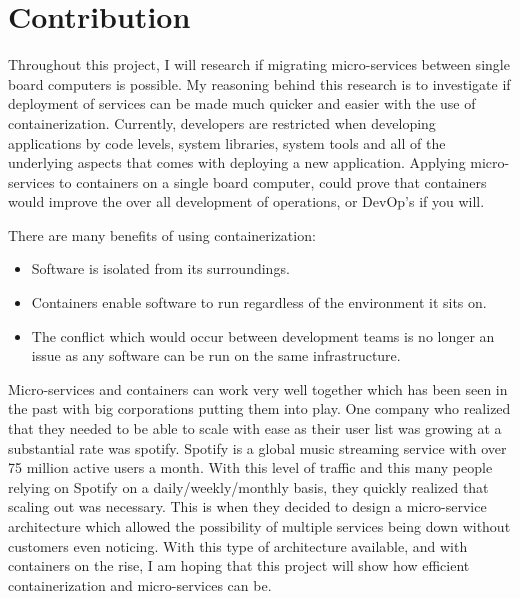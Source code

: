 
\section{Contribution}
Throughout this project, I will research if migrating micro-services between single board computers is possible. My reasoning behind this research is to investigate if deployment of services can be made much quicker and easier with the use of containerization. Currently, developers are restricted when developing applications by code levels, system libraries, system tools and all of the underlying aspects that comes with deploying a new application. Applying micro-services to containers on a single board computer, could prove that containers would improve the over all development of operations, or DevOp's if you will. 

There are many benefits of using containerization:

\begin{itemize}
\item Software is isolated from its surroundings.
\item Containers enable software to run regardless of the environment it sits on.
\item The conflict which would occur between development teams is no longer an issue as any software can be run on the same infrastructure.
\end{itemize}

Micro-services and containers can work very well together which has been seen in the past with big corporations putting them into play. One company who realized that they needed to be able to scale with ease as their user list was growing at a substantial rate was spotify. Spotify is a global music streaming service with over 75 million active users a month. With this level of traffic and this many people relying on Spotify on a daily/weekly/monthly basis, they quickly realized that scaling out was necessary. This is when they decided to design a micro-service architecture which allowed the possibility of multiple services being down without customers even noticing. With this type of architecture available, and with containers on the rise, I am hoping that this project will show how efficient containerization and micro-services can be.

